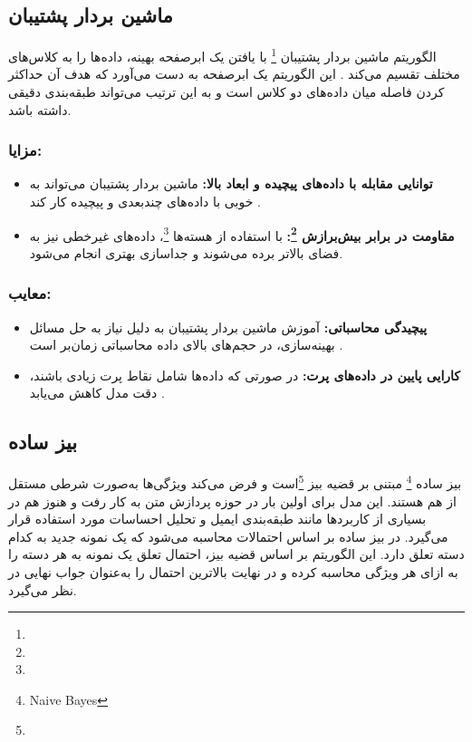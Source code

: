 \subsection{ماشین بردار پشتیبان}
الگوریتم ماشین بردار پشتیبان \footnote{} با یافتن یک ابرصفحه بهینه، داده‌ها را به کلاس‌های مختلف تقسیم می‌کند
\cite{cortes1995support,vapnik1998statistical}.
این الگوریتم یک ابرصفحه به دست می‌آورد که هدف آن حداکثر کردن فاصله میان داده‌های دو کلاس است و به این ترتیب می‌تواند طبقه‌بندی دقیقی داشته باشد.

\subsubsection{مزایا:}
\begin{itemize}
	\item \textbf{توانایی مقابله با داده‌های پیچیده و ابعاد بالا:}
	ماشین بردار پشتیبان  می‌تواند به خوبی با داده‌های چندبعدی و پیچیده کار کند
	\cite{vapnik1998statistical}.
	\item \textbf{مقاومت در برابر بیش‌برازش \footnote{}:}
با استفاده از هسته‌ها \footnote{}، داده‌های غیرخطی نیز به فضای بالاتر برده می‌شوند و جداسازی بهتری انجام می‌شود\cite{cortes1995support}.
\end{itemize}

\subsubsection{معایب:}
\begin{itemize}
	\item \textbf{پیچیدگی محاسباتی:}
	آموزش ماشین بردار پشتیبان به دلیل نیاز به حل مسائل بهینه‌سازی، در حجم‌های بالای داده محاسباتی زمان‌بر است
	\cite{murphy2012machine}.
	\item \textbf{کارایی پایین در داده‌های پرت:}
	در صورتی که داده‌ها شامل نقاط پرت زیادی باشند، دقت مدل کاهش می‌یابد
	\cite{bishop2006pattern}.
\end{itemize}


\subsection{بیز ساده}
بیز ساده \footnote{Naive Bayes} مبتنی بر قضیه بیز \footnote{}است و فرض می‌کند ویژگی‌ها به‌صورت شرطی مستقل از هم هستند\cite{domingos1997optimal,mitchell1997machine}.
این مدل برای اولین بار در حوزه پردازش متن به کار رفت و هنوز هم در بسیاری از کاربردها مانند طبقه‌بندی ایمیل و تحلیل احساسات مورد استفاده قرار می‌گیرد\cite{mccallum1998comparison}. 
در بیز ساده بر اساس احتمالات محاسبه می‌شود که یک نمونه جدید به کدام دسته تعلق دارد. این الگوریتم بر اساس قضیه بیز، احتمال تعلق یک نمونه به هر دسته را به ازای هر ویژگی محاسبه کرده و در نهایت بالاترین احتمال را به‌عنوان جواب نهایی در نظر می‌گیرد\cite{bishop2006pattern}.

